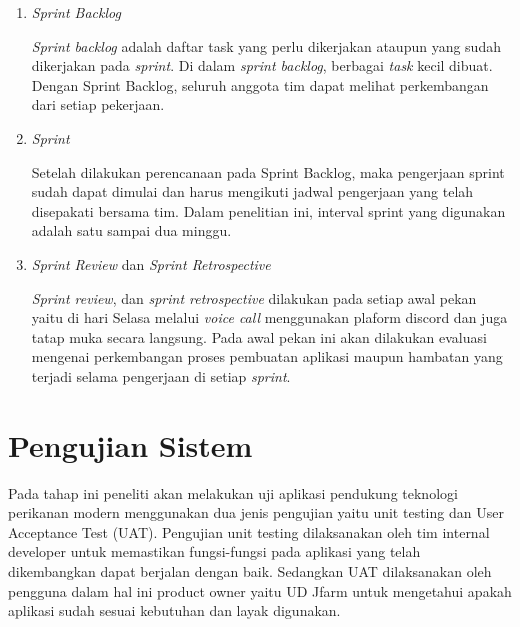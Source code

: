 \begin{enumerate}
	\item{\textit{Sprint Backlog}}

	\hspace{\enumerateparindent} \textit{Sprint backlog} adalah daftar task yang perlu dikerjakan ataupun yang sudah dikerjakan pada \textit{sprint}. Di dalam \textit{sprint backlog}, berbagai \textit{task} kecil dibuat. Dengan Sprint Backlog, seluruh anggota tim dapat melihat perkembangan dari setiap pekerjaan.

	\item{\textit{Sprint}}

	\hspace{\enumerateparindent} Setelah dilakukan perencanaan pada Sprint Backlog, maka pengerjaan sprint sudah dapat dimulai dan harus mengikuti jadwal pengerjaan yang telah disepakati bersama tim. Dalam penelitian ini, interval sprint yang digunakan adalah satu sampai dua minggu.

	\item{\textit{Sprint Review} dan \textit{Sprint Retrospective}}

	\hspace{\enumerateparindent} \textit{Sprint review}, dan \textit{sprint retrospective} dilakukan pada setiap awal pekan yaitu di hari Selasa melalui \textit{voice call} menggunakan plaform discord dan juga tatap muka secara langsung. Pada awal pekan ini akan dilakukan evaluasi mengenai perkembangan proses pembuatan aplikasi maupun hambatan yang terjadi selama pengerjaan di setiap \textit{sprint}.

\end{enumerate}

\section{Pengujian Sistem}
Pada tahap ini peneliti akan melakukan uji aplikasi pendukung teknologi perikanan modern menggunakan dua jenis pengujian yaitu unit testing dan User Acceptance Test (UAT). Pengujian unit testing dilaksanakan oleh tim internal developer untuk memastikan fungsi-fungsi pada aplikasi yang telah dikembangkan dapat berjalan dengan baik. Sedangkan UAT dilaksanakan oleh pengguna dalam hal ini product owner yaitu UD Jfarm untuk mengetahui apakah aplikasi sudah sesuai kebutuhan dan layak digunakan.


